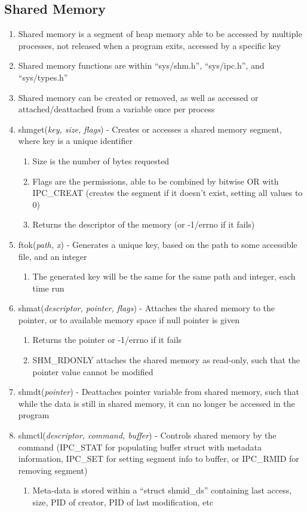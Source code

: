 \documentclass[11 pt, twoside]{article}
\begin{document}
\subsection{Shared Memory}
\begin{enumerate}
\item Shared memory is a segment of heap memory able to be accessed by multiple processes, not released when a program exits, accessed by a specific key
\item Shared memory functions are within ``sys/shm.h'', ``sys/ipc.h'', and ``sys/types.h''
\item Shared memory can be created or removed, as well as accessed or attached/deattached from a variable once per process
\item shmget(\textit{key, size, flags}) - Creates or accesses a shared memory segment, where key is a unique identifier
\begin{enumerate}
\item Size is the number of bytes requested
\item Flags are the permissions, able to be combined by bitwise OR with IPC_CREAT (creates the segment if it doesn't exist, setting all values to 0) 
\item Returns the descriptor of the memory (or -1/errno if it fails)
\end{enumerate}
\item ftok(\textit{path, x}) - Generates a unique key, based on the path to some accessible file, and an integer
\begin{enumerate}
\item The generated key will be the same for the same path and integer, each time run
\end{enumerate}
\item shmat(\textit{descriptor, pointer, flags}) - Attaches the shared memory to the pointer, or to available memory space if null pointer is given
\begin{enumerate}
\item Returns the pointer or -1/errno if it fails
\item SHM\_RDONLY attaches the shared memory as read-only, such that the pointer value cannot be modified
\end{enumerate}
\item shmdt(\textit{pointer}) - Deattaches pointer variable from shared memory, such that while the data is still in shared memory, it can no longer be accessed in the program
\item shmctl(\textit{descriptor, command, buffer}) - Controls shared memory by the command (IPC\_STAT for populating buffer struct with metadata information, IPC\_SET for setting segment info to buffer, or IPC\_RMID for removing segment)
\begin{enumerate}
\item Meta-data is stored within a ``struct shmid\_ds'' containing last access, size, PID of creator, PID of last modification, etc
\end{enumerate}
\end{enumerate}
\end{document}

